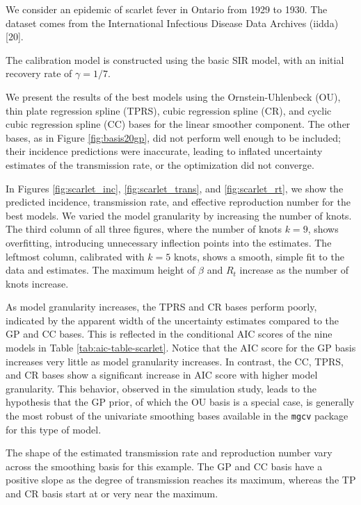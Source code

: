 \documentclass[
11pt, %
oneside, %
english, %
singlespacing, %
]{macthesis} %
\begin{document}
We consider an epidemic of scarlet fever in Ontario from 1929 to 1930. The dataset comes from the International Infectious Disease Data Archives (iidda) {[}20{]}.

The calibration model is constructed using the basic SIR model, with an initial recovery rate of \(\gamma = 1/7\).

We present the results of the best models using the Ornstein-Uhlenbeck (OU), thin plate regression spline (TPRS), cubic regression spline (CR), and cyclic cubic regression spline (CC) bases for the linear smoother component. The other bases, as in Figure \ref{fig:basis20gp}, did not perform well enough to be included; their incidence predictions were inaccurate, leading to inflated uncertainty estimates of the transmission rate, or the optimization did not converge.

In Figures \ref{fig:scarlet_inc}, \ref{fig:scarlet_trans}, and \ref{fig:scarlet_rt}, we show the predicted incidence, transmission rate, and effective reproduction number for the best models. We varied the model granularity by increasing the number of knots. The third column of all three figures, where the number of knots \(k=9\), shows overfitting, introducing unnecessary inflection points into the estimates. The leftmost column, calibrated with \(k=5\) knots, shows a smooth, simple fit to the data and estimates. The maximum height of \(\beta\) and \(R_t\) increase as the number of knots increase.

As model granularity increases, the TPRS and CR bases perform poorly, indicated by the apparent width of the uncertainty estimates compared to the GP and CC bases. This is reflected in the conditional AIC scores of the nine models in Table \ref{tab:aic-table-scarlet}. Notice that the AIC score for the GP basis increases very little as model granularity increases. In contrast, the CC, TPRS, and CR bases show a significant increase in AIC score with higher model granularity. This behavior, observed in the simulation study, leads to the hypothesis that the GP prior, of which the OU basis is a special case, is generally the most robust of the univariate smoothing bases available in the \texttt{mgcv} package for this type of model.

The shape of the estimated transmission rate and reproduction number vary across the smoothing basis for this example. The GP and CC basis have a positive slope as the degree of transmission reaches its maximum, whereas the TP and CR basis start at or very near the maximum.
\end{document}
